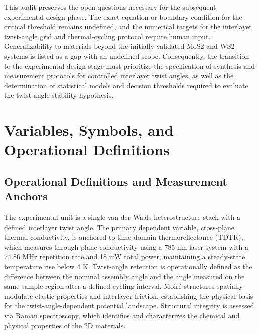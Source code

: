 \documentclass[conference]{IEEEtran}
\begin{document}
This audit preserves the open questions necessary for the subsequent experimental design phase. The exact equation or boundary condition for the critical threshold remains undefined, and the numerical targets for the interlayer twist-angle grid and thermal-cycling protocol require human input. Generalizability to materials beyond the initially validated MoS2 and WS2 systems is listed as a gap with an undefined scope. Consequently, the transition to the experimental design stage must prioritize the specification of synthesis and measurement protocols for controlled interlayer twist angles, as well as the determination of statistical models and decision thresholds required to evaluate the twist-angle stability hypothesis.~\cite{cite_26ecaf73d88dfe33}

\section{Variables, Symbols, and Operational Definitions}
\subsection{Operational Definitions and Measurement Anchors}
The experimental unit is a single van der Waals heterostructure stack with a defined interlayer twist angle. The primary dependent variable, cross-plane thermal conductivity, is anchored to time-domain thermoreflectance (TDTR), which measures through-plane conductivity using a 785 nm laser system with a 74.86 MHz repetition rate and 18 mW total power, maintaining a steady-state temperature rise below 4 K. Twist-angle retention is operationally defined as the difference between the nominal assembly angle and the angle measured on the same sample region after a defined cycling interval. Moiré structures spatially modulate elastic properties and interlayer friction, establishing the physical basis for the twist-angle-dependent potential landscape. Structural integrity is assessed via Raman spectroscopy, which identifies and characterizes the chemical and physical properties of the 2D materials.~\cite{cite_26ecaf73d88dfe33,cite_6b49ace365c37cc5,cite_9776eb140ec8227e}
\end{document}
